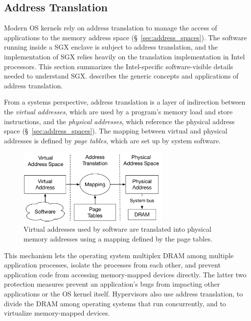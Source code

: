 \subsection{Address Translation}
\label{sec:paging}

Modern OS kernels rely on address translation to manage the access of
applications to the memory address space (\S~\ref{sec:address_spaces}). The
software running inside a SGX enclave is subject to address translation, and
the implementation of SGX relies heavily on the translation implementation in
Intel processors. This section summarizes the Intel-specific software-visible
details needed to understand SGX. \cite{jacob1998virtual} describes the generic
concepts and applications of address translation.

From a systems perspective, address translation is a layer of indirection
between the \textit{virtual addresses}, which are used by a program's memory
load and store instructions, and the \textit{physical addresses}, which
reference the physical address space (\S~\ref{sec:address_spaces}). The mapping
between virtual and physical addresses is defined by \textit{page tables},
which are set up by system software.

\begin{figure}[hbt]
  \centering
  \includegraphics[width=75mm]{figures/address_translation.pdf}
  \caption{
    Virtual addresses used by software are translated into physical memory
    addresses using a mapping defined by the page tables.
  }
  \label{fig:address_translation}
\end{figure}

This mechanism lets the operating system multiplex DRAM among multiple
application processes, isolate the processes from each other, and prevent
application code from accessing memory-mapped devices directly. The latter two
protection measures prevent an application's bugs from impacting other
applications or the OS kernel itself. Hypervisors also use address translation,
to divide the DRAM among operating systems that run concurrently, and to
virtualize memory-mapped devices.


